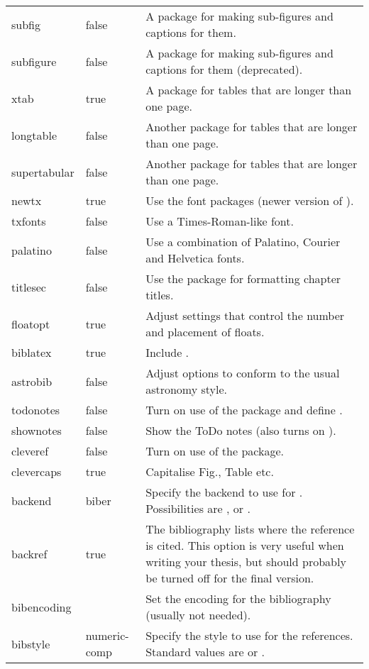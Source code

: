 \begin{xtabular}{llp{11.0cm}}
  subfig & false & A package for making sub-figures and captions for them.\\
  subfigure & false & A package for making sub-figures and captions for them (deprecated).\\
  xtab & true & A package for tables that are longer than one page.\\
  longtable & false &  Another package for tables that are longer than one page.\\
  supertabular & false &  Another package for tables that are longer than one page.\\
  newtx & true & Use the  font packages (newer version of ).\\
  txfonts & false & Use a Times-Roman-like font.\\
  palatino & false & Use a combination of Palatino, Courier and Helvetica fonts.\\
  titlesec & false & Use the  package for formatting chapter titles.\\
  floatopt & true & Adjust settings that control the number and placement of floats.\\
  biblatex & true & Include .\\
  astrobib & false & Adjust  options to conform to the usual astronomy style.\\
  todonotes & false & Turn on use of the  package and define .\\
  shownotes & false & Show the ToDo notes (also turns on ).\\
  cleveref & false & Turn on use of the  package.\\
  clevercaps & true & Capitalise Fig., Table etc.\\
  backend & biber & Specify the backend to use for .
    Possibilities are ,  or .\\
  backref & true & The bibliography lists where the reference is cited.
    This option is very useful when writing your thesis,
    but should probably be turned off for the final version.\\
  bibencoding & & Set the encoding for the bibliography (usually not needed).\\
  bibstyle & numeric-comp & Specify the style to use for the references. 
    Standard values are  or .\\
\end{xtabular}

